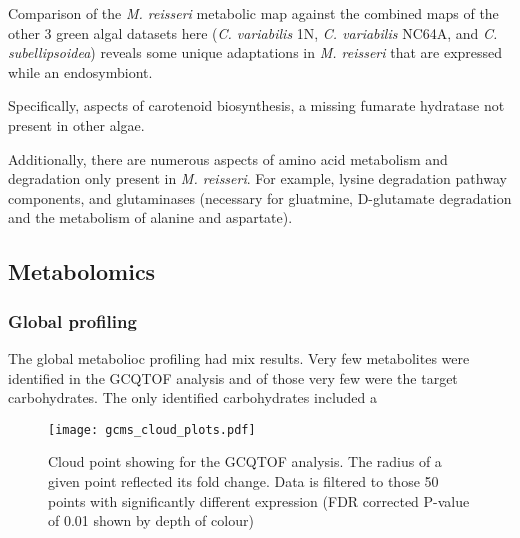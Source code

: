 Comparison of the \textit{M. reisseri} metabolic map against the combined
maps of the other 3 green algal datasets here (\textit{C. variabilis} 1N, 
\textit{C. variabilis} NC64A, and \textit{C. subellipsoidea}) reveals
some unique adaptations in \textit{M. reisseri} that are expressed while 
an endosymbiont.  

Specifically, aspects of carotenoid biosynthesis, a missing fumarate hydratase
not present in other algae.  

Additionally, there are numerous aspects of amino acid metabolism and degradation
only present in \textit{M. reisseri}. For example, lysine degradation pathway components, 
and glutaminases (necessary for gluatmine, D-glutamate degradation and the metabolism of
alanine and aspartate). 

\subsection{Metabolomics} 

\subsubsection{Global profiling}

The global metabolioc profiling had mix results.
Very few metabolites were identified in the GCQTOF
analysis and of those very few were the target carbohydrates.
The only identified carbohydrates included a 


\begin{figure}
    \centering
    \texttt{[image: gcms\_cloud\_plots.pdf]}
    \caption[GCQTOF Cloud Plot]{Cloud point showing for the GCQTOF analysis. 
    The radius of a given point reflected its fold change.
    Data is filtered to those 50 points with significantly 
different expression (FDR corrected P-value of 0.01 shown by 
depth of colour)}
    \label{fig:gcms_clouds}
\end{figure}


